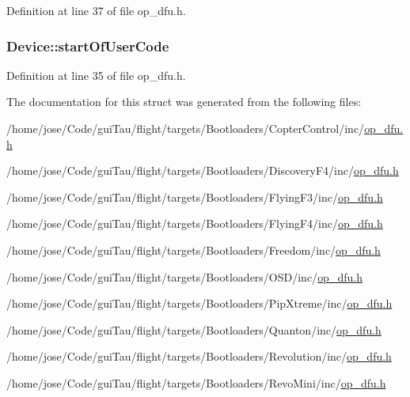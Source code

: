 Definition at line 37 of file op\-\_\-dfu.\-h.

\hypertarget{struct_device_a34965e275b7c25a39a849f168098b130}{
\subsubsection[{start\-Of\-User\-Code}]{ Device\-::start\-Of\-User\-Code}}\label{struct_device_a34965e275b7c25a39a849f168098b130}


Definition at line 35 of file op\-\_\-dfu.\-h.



The documentation for this struct was generated from the following files\-:\begin{DoxyCompactItemize}
\item 
/home/jose/\-Code/gui\-Tau/flight/targets/\-Bootloaders/\-Copter\-Control/inc/\hyperlink{_copter_control_2inc_2op__dfu_8h}{op\-\_\-dfu.\-h}\item 
/home/jose/\-Code/gui\-Tau/flight/targets/\-Bootloaders/\-Discovery\-F4/inc/\hyperlink{_discovery_f4_2inc_2op__dfu_8h}{op\-\_\-dfu.\-h}\item 
/home/jose/\-Code/gui\-Tau/flight/targets/\-Bootloaders/\-Flying\-F3/inc/\hyperlink{_flying_f3_2inc_2op__dfu_8h}{op\-\_\-dfu.\-h}\item 
/home/jose/\-Code/gui\-Tau/flight/targets/\-Bootloaders/\-Flying\-F4/inc/\hyperlink{_flying_f4_2inc_2op__dfu_8h}{op\-\_\-dfu.\-h}\item 
/home/jose/\-Code/gui\-Tau/flight/targets/\-Bootloaders/\-Freedom/inc/\hyperlink{_freedom_2inc_2op__dfu_8h}{op\-\_\-dfu.\-h}\item 
/home/jose/\-Code/gui\-Tau/flight/targets/\-Bootloaders/\-O\-S\-D/inc/\hyperlink{_o_s_d_2inc_2op__dfu_8h}{op\-\_\-dfu.\-h}\item 
/home/jose/\-Code/gui\-Tau/flight/targets/\-Bootloaders/\-Pip\-Xtreme/inc/\hyperlink{_pip_xtreme_2inc_2op__dfu_8h}{op\-\_\-dfu.\-h}\item 
/home/jose/\-Code/gui\-Tau/flight/targets/\-Bootloaders/\-Quanton/inc/\hyperlink{_quanton_2inc_2op__dfu_8h}{op\-\_\-dfu.\-h}\item 
/home/jose/\-Code/gui\-Tau/flight/targets/\-Bootloaders/\-Revolution/inc/\hyperlink{_revolution_2inc_2op__dfu_8h}{op\-\_\-dfu.\-h}\item 
/home/jose/\-Code/gui\-Tau/flight/targets/\-Bootloaders/\-Revo\-Mini/inc/\hyperlink{_revo_mini_2inc_2op__dfu_8h}{op\-\_\-dfu.\-h}\end{DoxyCompactItemize}

